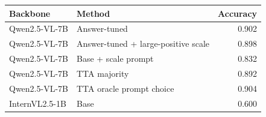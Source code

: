 \begin{tabular}{llr}
\toprule
Backbone & Method & Accuracy \\
\midrule
Qwen2.5-VL-7B & Answer-tuned & 0.902 \\
Qwen2.5-VL-7B & Answer-tuned + large-positive scale & 0.898 \\
Qwen2.5-VL-7B & Base + scale prompt & 0.832 \\
Qwen2.5-VL-7B & TTA majority & 0.892 \\
Qwen2.5-VL-7B & TTA oracle prompt choice & 0.904 \\
InternVL2.5-1B & Base & 0.600 \\
\bottomrule
\end{tabular}
